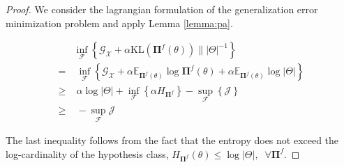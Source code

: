 \begin{proof}
    We consider the lagrangian formulation of the generalization error minimization problem 
    and apply Lemma \ref{lemma:pa}.

    $$
    \begin{aligned}
        & \inf_{\mathcal{F}} \left \{ \mathcal{G}_{\mathcal{X}} + \alpha \text{KL} (\mathbf{\Pi}^f(\theta)) \parallel |\Theta|^{-1} \right \} \\
        = & \; \inf_{\mathcal{F}} \left \{ \mathcal{G}_{\mathcal{X}} + \alpha \mathbb{E}_{\mathbf{\Pi}^f(\theta)} \log \mathbf{\Pi}^f(\theta) + \alpha \mathbb{E}_{\mathbf{\Pi}^f(\theta)} \log |\Theta| \right \} \\
        \geq & \; \alpha \log |\Theta| + \inf_{\mathcal{F}} \left \{ \alpha H_{\mathbf{\Pi}^f} \right \} - \sup_{\mathcal{F}} \left \{ \mathcal{J} \right \} \\
        \geq & \; - \sup_{\mathcal{F}} \mathcal{J}
    \end{aligned}
    $$



    The last inequality follows from the fact that the entropy does not exceed the log-cardinality
    of the hypothesis class, $H_{\mathbf{\Pi}^f}(\theta) \leq \log |\Theta|, \;\; \forall \mathbf{\Pi}^f$.
\end{proof}

